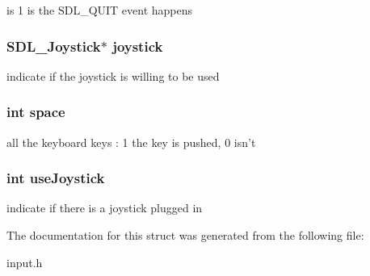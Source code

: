 is 1 is the S\-D\-L\-\_\-\-Q\-U\-I\-T event happens \hypertarget{struct_input_a5fe6c6b426f70a21df07c64227b2c337}{
\subsubsection[{joystick}]{\setlength{\rightskip}{0pt plus 5cm}S\-D\-L\-\_\-\-Joystick$\ast$ joystick}}\label{struct_input_a5fe6c6b426f70a21df07c64227b2c337}
indicate if the joystick is willing to be used \hypertarget{struct_input_ab05991ed532329184893692211b355fa}{
\subsubsection[{space}]{\setlength{\rightskip}{0pt plus 5cm}int space}}\label{struct_input_ab05991ed532329184893692211b355fa}
all the keyboard keys \-: 1 the key is pushed, 0 isn't \hypertarget{struct_input_a66b84ad51037935b993fc2b860b15cb6}{
\subsubsection[{use\-Joystick}]{\setlength{\rightskip}{0pt plus 5cm}int use\-Joystick}}\label{struct_input_a66b84ad51037935b993fc2b860b15cb6}
indicate if there is a joystick plugged in 

The documentation for this struct was generated from the following file\-:\begin{DoxyCompactItemize}
\item 
input.\-h\end{DoxyCompactItemize}
